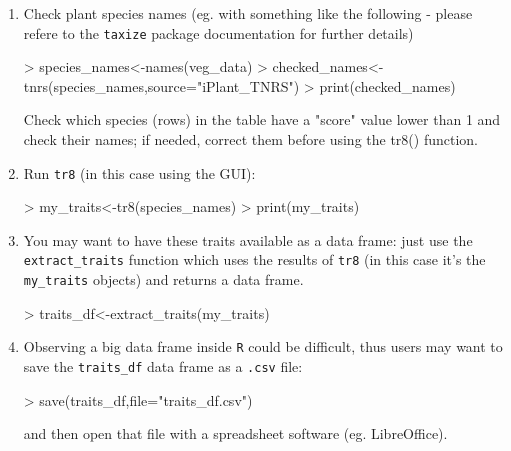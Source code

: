 \documentclass{article}
\begin{document}
  \begin{enumerate}
  \item Check plant species names (eg. with something like the following -  please refere to the \texttt{taxize} package documentation\cite{taxize} for further details)
    
\begin{Schunk}
\begin{Sinput}
> species_names<-names(veg_data)
> checked_names<-tnrs(species_names,source="iPlant_TNRS")
> print(checked_names)
\end{Sinput}
\end{Schunk}

 Check which species (rows) in the table have a "score" value
 lower than 1 and check their names; if needed, correct them
 before using the tr8() function.
\item Run \texttt{tr8}  (in this case using the GUI):

\begin{Schunk}
\begin{Sinput}
> my_traits<-tr8(species_names)
> print(my_traits)
\end{Sinput}
\end{Schunk}
 
\item You may want to have these traits available as a data frame:
  just use the \texttt{extract\_traits} function which uses the results
  of \texttt{tr8} (in this case it's the \texttt{my\_traits} objects)
  and returns a data frame.

\begin{Schunk}
\begin{Sinput}
> traits_df<-extract_traits(my_traits)
\end{Sinput}
\end{Schunk}

\item Observing a big data frame inside \texttt{R} could be difficult,
  thus users may want to save the \texttt{traits\_df} data frame as a
  \texttt{.csv} file:  
\begin{Schunk}
\begin{Sinput}
> save(traits_df,file="traits_df.csv")
\end{Sinput}
\end{Schunk}
  
and then open that file with a spreadsheet software (eg. LibreOffice).

  
  \end{enumerate}
  
\end{document}
